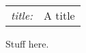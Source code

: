 \documentclass[12pt]{article}
\begin{document}
\sloppy\sloppypar

\noindent
\begin{tabular}{ll}
\textsl{title:}    & A title \\
\end{tabular}
\bigskip

Stuff here.
\end{document}
